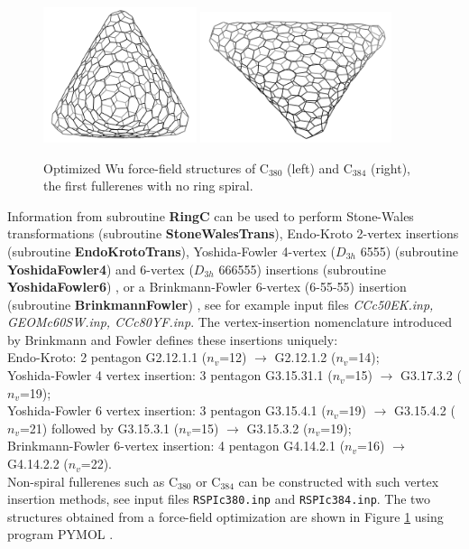 \documentclass[article,a4paper,twoside]{memoir}
\newcommand{\C}[1]{\ensuremath{\mathrm{C}_{#1}}}
\newcommand{\filename}[1]{\texttt{#1}}
\newcommand{\funname}[1]{{\color{blue}\textbf{#1}}}
\begin{document}
 \begin{figure}[htbp]
   	\centering
  	\includegraphics[width=0.4\textwidth]{C380.png}
	\includegraphics[width=0.5\textwidth]{C384.png}
    \caption{Optimized Wu force-field structures of \C{380} (left) and \C{384} (right), the first fullerenes with no ring spiral.}
	\label{pic:C380andC384}
 \end{figure}

Information from subroutine \funname{RingC} can be used to perform Stone-Wales transformations \cite{Stone86}
(subroutine \funname{StoneWalesTrans}), Endo-Kroto 2-vertex insertions \cite{Endo92} (subroutine \funname{EndoKrotoTrans}),
Yoshida-Fowler 4-vertex ($D_{3h}$ 6555) (subroutine \funname{YoshidaFowler4}) and 6-vertex ($D_{3h}$ 666555)
insertions (subroutine \funname{YoshidaFowler6}) \cite{Yoshida97a}, or a Brinkmann-Fowler 6-vertex (6-55-55) insertion 
(subroutine \funname{BrinkmannFowler}) \cite{BrinkmannFowler03}, see for example input files \textit{CCc50EK.inp, GEOMc60SW.inp, CCc80YF.inp}.
The vertex-insertion nomenclature introduced by Brinkmann and Fowler \cite{BrinkmannFowler03} defines these insertions uniquely:\\
Endo-Kroto: 2 pentagon G2.12.1.1 ($n_v$=12) $\rightarrow$ G2.12.1.2 ($n_v$=14);\\ 
Yoshida-Fowler 4 vertex insertion: 3 pentagon G3.15.31.1 ($n_v$=15) $\rightarrow$ G3.17.3.2 ($n_v$=19);\\
Yoshida-Fowler 6 vertex insertion: 3 pentagon G3.15.4.1 ($n_v$=19) $\rightarrow$ G3.15.4.2 ($n_v$=21) 
followed by G3.15.3.1 ($n_v$=15) $\rightarrow$ G3.15.3.2 ($n_v$=19);\\
Brinkmann-Fowler 6-vertex insertion: 4 pentagon G4.14.2.1 ($n_v$=16) $\rightarrow$ G4.14.2.2 ($n_v$=22).\\
Non-spiral fullerenes such as  \C{380} or  \C{384} can be constructed with such vertex insertion methods, see input files \filename{RSPIc380.inp} 
and \filename{RSPIc384.inp}. The two structures obtained from a force-field optimization are shown in Figure \ref{pic:C380andC384} using program PYMOL \cite{Pymol}.
\end{document}
